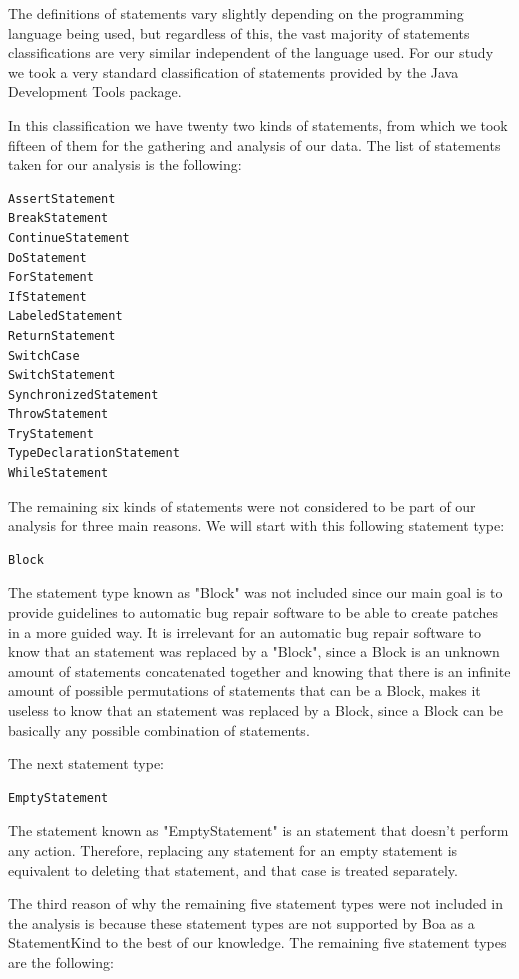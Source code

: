 \documentclass{sig-alternate-05-2015}
\begin{document}
The definitions of statements vary slightly depending on the programming language being used, but regardless of this, the vast majority of statements classifications are very similar independent of the language used. For our study we took a very standard classification of statements provided by the Java Development Tools package.

In this classification we have twenty two kinds of statements, from which we took fifteen of them for the gathering and analysis of our data. The list of statements taken for our analysis is the following:

\begin{verbatim}
AssertStatement
BreakStatement
ContinueStatement 
DoStatement 
ForStatement 
IfStatement 
LabeledStatement
ReturnStatement 
SwitchCase 
SwitchStatement 
SynchronizedStatement
ThrowStatement 
TryStatement 
TypeDeclarationStatement
WhileStatement
\end{verbatim}

The remaining six kinds of statements were not considered to be part of our analysis for three main reasons. We will start with this following statement type:

\begin{verbatim}
Block
\end{verbatim}

The statement type known as "Block" was not included since our main goal is to provide guidelines to automatic bug repair software to be able to create patches in a more guided way. It is irrelevant for an automatic bug repair software to know that an statement was replaced by a "Block", since a Block is an unknown amount of statements concatenated together and knowing that there is an infinite amount of possible permutations of statements that can be a Block, makes it useless to know that an statement was replaced by a Block, since a Block can be basically any possible combination of statements.

The next statement type:
\begin{verbatim}
EmptyStatement 
\end{verbatim}

The statement known as "EmptyStatement" is an statement that doesn't perform any action. Therefore, replacing any statement for an empty statement is equivalent to deleting that statement, and that case is treated separately.

The third reason of why the remaining five statement types were not included in the analysis is because these statement types are not supported by Boa as a StatementKind to the best of our knowledge. The remaining five statement types are the following:
\end{document}
